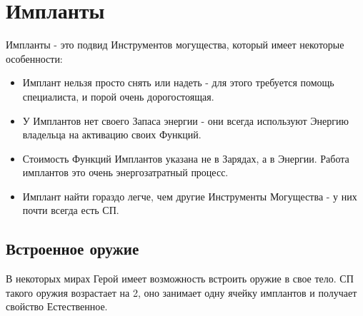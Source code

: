\section{Импланты}
Импланты - это подвид Инструментов могущества, который имеет некоторые особенности:
\begin{itemize}
\item Имплант нельзя просто снять или надеть - для этого требуется помощь специалиста, и порой очень дорогостоящая.
\item У Имплантов нет своего Запаса энергии - они всегда используют Энергию владельца на активацию своих Функций.
\item Стоимость Функций Имплантов указана не в Зарядах, а в Энергии. Работа имплантов это очень энергозатратный процесс.
\item Имплант найти гораздо легче, чем другие Инструменты Могущества - у них почти всегда есть СП.
\end{itemize}
\subsection{Встроенное оружие}
В некоторых мирах Герой имеет возможность встроить оружие в свое тело. СП такого оружия возрастает на 2, оно занимает одну ячейку имплантов и получает свойство Естественное.

